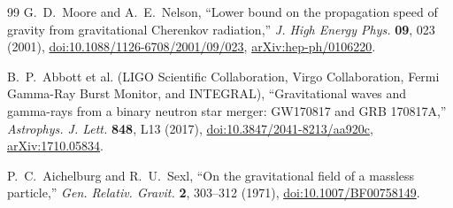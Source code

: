 \documentclass[11pt,a4paper]{article}
\numberwithin{equation}{section}
\begin{document}
\begin{thebibliography}{99}
G.~D.~Moore and A.~E.~Nelson,
``Lower bound on the propagation speed of gravity from gravitational Cherenkov radiation,''
\emph{J. High Energy Phys.} \textbf{09}, 023 (2001),
\href{https://doi.org/10.1088/1126-6708/2001/09/023}{doi:10.1088/1126-6708/2001/09/023},
\href{https://arxiv.org/abs/hep-ph/0106220}{arXiv:hep-ph/0106220}.

B.~P.~Abbott et al. (LIGO Scientific Collaboration, Virgo Collaboration,
Fermi Gamma-Ray Burst Monitor, and INTEGRAL),
``Gravitational waves and gamma-rays from a binary neutron star merger:
GW170817 and GRB 170817A,''
\emph{Astrophys. J. Lett.} \textbf{848}, L13 (2017),
\href{https://doi.org/10.3847/2041-8213/aa920c}{doi:10.3847/2041-8213/aa920c},
\href{https://arxiv.org/abs/1710.05834}{arXiv:1710.05834}.

P.~C.~Aichelburg and R.~U.~Sexl,
``On the gravitational field of a massless particle,''
\emph{Gen. Relativ. Gravit.} \textbf{2}, 303--312 (1971),
\href{https://doi.org/10.1007/BF00758149}{doi:10.1007/BF00758149}.

\end{thebibliography}
\end{document}
